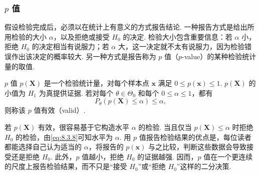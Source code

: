 \subsubsection{\texorpdfstring{$p$}{p} 值}\label{sec:8.3.4}
假设检验完成后，必须以在统计上有意义的方式报告结论. 一种报告方式是给出所用检验的大小 $\alpha$，以及拒绝或接受 $H_0$ 的决定. 检验大小包含重要信息：若 $\alpha$ 小，拒绝 $H_0$ 的决定相当有说服力；若 $\alpha$ 大，这一决定就不太有说服力，因为检验错误作出该决定的概率较大. 另一种方式是报告称为 $p$ 值（$p$-value）的某种检验统计量的取值.
\begin{definition}\label{def:8.3.26}
$p$ 值 $p(\boldsymbol X)$ 是一个检验统计量，对每个样本点 $\boldsymbol x$ 满足 $0\le p(\boldsymbol x)\le1$. $p(\boldsymbol X)$ 的小值为 $H_1$ 为真提供证据. 若对每个 $\theta\in\Theta_0$ 和每个 $0\le\alpha\le1$，都有
\begin{equation}\label{eq:8.3.8}P_\theta(p(\boldsymbol X)\le\alpha)\le\alpha,\end{equation}
则称该 $p$ 值有效（valid\mbox{）.}
\end{definition}
若 $p(\boldsymbol X)$ 有效，很容易基于它构造水平 $\alpha$ 的检验. 当且仅当 $p(\boldsymbol X)\le\alpha$ 时拒绝 $H_0$ 的检验，由\eqref{eq:8.3.8}可知水平为 $\alpha$. 用 $p$ 值报告检验结果的优点是，每位读者都能选择自己认为适当的 $\alpha$，将报告的 $p(\boldsymbol x)$ 与之比较，判断这些数据会导致接受还是拒绝 $H_0$. 此外，$p$ 值越小，拒绝 $H_0$ 的证据越强. 因而，$p$ 值在一个更连续的尺度上报告检验结果，而不只是“接受 $H_0$”或“拒绝 $H_0$”这样的二分决策.

